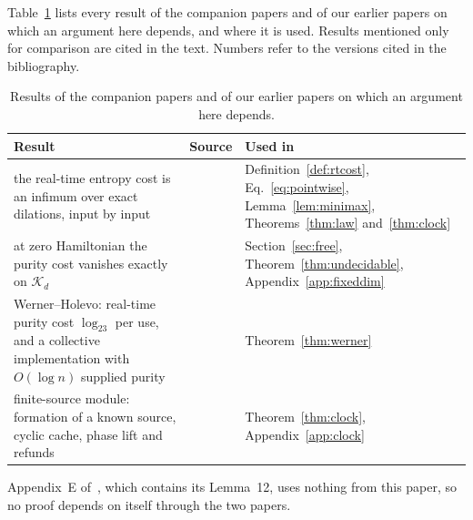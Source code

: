 \documentclass[11pt]{article}
\theoremstyle{definition}
\theoremstyle{remark}
\providecommand{\K}{\mathcal K}
\begin{document}
Table~\ref{tab:companions} lists every result of the companion papers and of our earlier papers on which an argument here depends, and where it is used. Results mentioned only for comparison are cited in the text. Numbers refer to the versions cited in the bibliography.

\begin{table}[ht]
\centering\small
\begin{tabular}{@{}>{\raggedright\arraybackslash}p{}>{\raggedright\arraybackslash}p{}>{\raggedright\arraybackslash}p{}@{}}
\toprule
Result & Source & Used in\\
\midrule
the real-time entropy cost is an infimum over exact dilations, input by input & \cite[Cor.~4.3]{ClosedMemory} & Definition~\ref{def:rtcost}, Eq.~\eqref{eq:pointwise}, Lemma~\ref{lem:minimax}, Theorems~\ref{thm:law} and~\ref{thm:clock}\\
at zero Hamiltonian the purity cost vanishes exactly on $\K_d$ & \cite[Thm.~3.2(a)]{Memory} & Section~\ref{sec:free}, Theorem~\ref{thm:undecidable}, Appendix~\ref{app:fixeddim}\\
Werner--Holevo: real-time purity cost $\log_23$ per use, and a collective implementation with $O(\log n)$ supplied purity & \cite[Thms.~3.1, 3.3]{ImmediateDelivery} & Theorem~\ref{thm:werner}\\
finite-source module: formation of a known source, cyclic cache, phase lift and refunds & \cite[Lemma~12, App.~E]{Answering} & Theorem~\ref{thm:clock}, Appendix~\ref{app:clock}\\
\bottomrule
\end{tabular}
\caption{Results of the companion papers and of our earlier papers on which an argument here depends.}\label{tab:companions}
\end{table}

Appendix~E of~\cite{Answering}, which contains its Lemma~12, uses nothing from this paper, so no proof depends on itself through the two papers.



\end{document}
